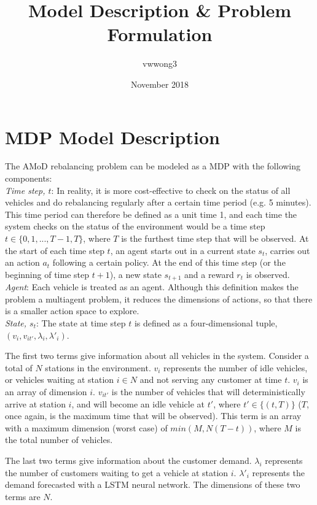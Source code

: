 \documentclass{article}
\title{Model Description & Problem Formulation}
\author{vwwong3 }
\date{November 2018}
\begin{document}
\maketitle

\section{MDP Model Description}
The AMoD rebalancing problem can be modeled as a MDP with the following components: \\

\noindent \textit{Time step, $t$}: In reality, it is more cost-effective to check on the status of all vehicles and do rebalancing regularly after a certain time period (e.g. 5 minutes). This time period can therefore be defined as a unit time 1, and each time the system checks on the status of the environment would be a time step $t \in \{0,1,...,T-1,T\}$, where $T$ is the furthest time step that will be observed. At the start of each time step $t$, an agent starts out in a current state $s_t$, carries out an action $a_t$ following a certain policy. At the end of this time step (or the beginning of time step $t+1$), a new state $s_{t+1}$ and a reward $r_t$ is observed.\\

\noindent \textit{Agent}: Each vehicle is treated as an agent. Although this definition makes the problem a multiagent problem, it reduces the dimensions of actions, so that there is a smaller action space to explore. \\

\noindent \textit{State, $s_t$}: The state at time step $t$ is defined as a four-dimensional tuple, $(v_i,v_{it'},\lambda_i,\lambda'_i)$.

The first two terms give information about all vehicles in the system. Consider a total of $N$ stations in the environment. $v_i$ represents the number of idle vehicles, or vehicles waiting at station $i\in N$ and not serving any customer at time $t$. $v_i$ is an array of dimension $i$. $v_{it'}$ is the number of vehicles that will deterministically arrive at station $i$, and will become an idle vehicle at $t'$, where $t'\in \{(t,T)\}$ ($T$, once again, is the maximum time that will be observed). This term is an array with a maximum dimension (worst case) of $min(M,N(T-t))$, where $M$ is the total number of vehicles.

The last two terms give information about the customer demand. $\lambda_i$ represents the number of customers waiting to get a vehicle at station $i$. $\lambda'_i$ represents the demand forecasted with a LSTM neural network. The dimensions of these two terms are $N$.
\end{document}
